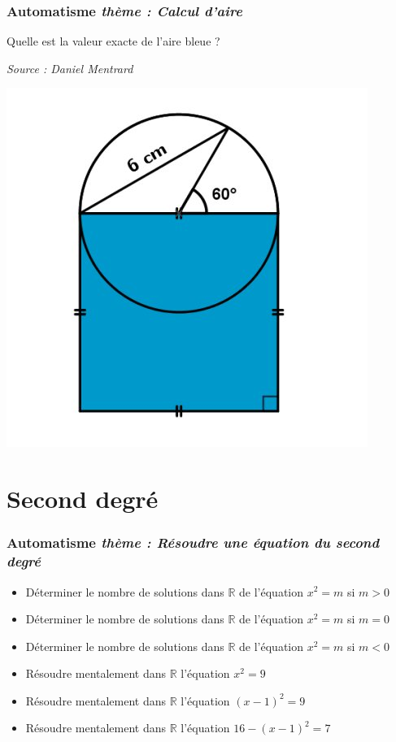 \documentclass[11pt]{beamer}
\newcommand{\R}{\mathbb{R}}
\newcounter{autocompteur}
\newcommand{\automatisme}[1]{\addtocounter{autocompteur}{1}\frametitle{Automatisme  \theautocompteur  \textit{ thème : #1}}}
\begin{document}
\begin{frame}
\automatisme{Calcul d'aire}
Quelle est la valeur exacte de l'aire bleue ?

{\small \textit{Source : Daniel Mentrard}}

\begin{center}
\includegraphics[scale=0.25]{ressources/blue-area-2023-03-19.jpeg}
\end{center}

\end{frame}



\section{Second degré}


\begin{frame}
\automatisme{Résoudre une équation du second degré}


\begin{itemize}
\item Déterminer le nombre de solutions dans $\R$ de l'équation  $x^{2}=m$ si $m>0$
\item Déterminer le nombre de solutions dans $\R$ de l'équation  $x^{2}=m$ si $m=0$
\item Déterminer le nombre de solutions dans $\R$ de l'équation  $x^{2}=m$ si $m<0$
\item Résoudre mentalement dans $\R$ l'équation $x^{2}=9$
\item Résoudre mentalement dans $\R$ l'équation $(x-1)^{2}=9$
\item Résoudre mentalement dans $\R$ l'équation $16-(x-1)^{2}=7$
\end{itemize}

\end{frame}
\end{document}
